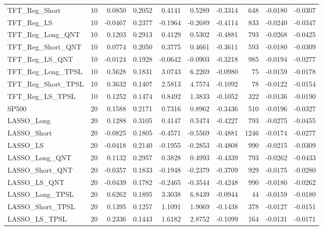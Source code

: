 \begin{tabular}{llrrrrrrrr}
\cline{1-10}
TFT\_Reg\_Short & 10 & 0.0850 & 0.2052 & 0.4141 & 0.5289 & -0.3314 & 648 & -0.0180 & -0.0307 \\
\cline{1-10}
TFT\_Reg\_LS & 10 & -0.0467 & 0.2377 & -0.1964 & -0.2689 & -0.4114 & 833 & -0.0240 & -0.0347 \\
\cline{1-10}
TFT\_Reg\_Long\_QNT & 10 & 0.1203 & 0.2913 & 0.4129 & 0.5302 & -0.4881 & 793 & -0.0268 & -0.0425 \\
\cline{1-10}
TFT\_Reg\_Short\_QNT & 10 & 0.0774 & 0.2050 & 0.3775 & 0.4661 & -0.3611 & 593 & -0.0180 & -0.0309 \\
\cline{1-10}
TFT\_Reg\_LS\_QNT & 10 & -0.0124 & 0.1928 & -0.0642 & -0.0903 & -0.3218 & 985 & -0.0194 & -0.0277 \\
\cline{1-10}
TFT\_Reg\_Long\_TPSL & 10 & 0.5628 & 0.1831 & 3.0743 & 6.2269 & -0.0980 & 75 & -0.0159 & -0.0178 \\
\cline{1-10}
TFT\_Reg\_Short\_TPSL & 10 & 0.3632 & 0.1407 & 2.5813 & 4.7574 & -0.1092 & 78 & -0.0122 & -0.0154 \\
\cline{1-10}
TFT\_Reg\_LS\_TPSL & 10 & 0.1252 & 0.1474 & 0.8492 & 1.3833 & -0.1052 & 322 & -0.0136 & -0.0190 \\
\cline{1-10}
SP500 & 20 & 0.1588 & 0.2171 & 0.7316 & 0.8962 & -0.3436 & 510 & -0.0196 & -0.0327 \\
\cline{1-10}
LASSO\_Long & 20 & 0.1288 & 0.3105 & 0.4147 & 0.5474 & -0.4227 & 793 & -0.0275 & -0.0455 \\
\cline{1-10}
LASSO\_Short & 20 & -0.0825 & 0.1805 & -0.4571 & -0.5569 & -0.4881 & 1246 & -0.0174 & -0.0277 \\
\cline{1-10}
LASSO\_LS & 20 & -0.0418 & 0.2140 & -0.1955 & -0.2853 & -0.4808 & 990 & -0.0215 & -0.0309 \\
\cline{1-10}
LASSO\_Long\_QNT & 20 & 0.1132 & 0.2957 & 0.3828 & 0.4993 & -0.4339 & 793 & -0.0262 & -0.0433 \\
\cline{1-10}
LASSO\_Short\_QNT & 20 & -0.0357 & 0.1833 & -0.1948 & -0.2379 & -0.3709 & 929 & -0.0175 & -0.0280 \\
\cline{1-10}
LASSO\_LS\_QNT & 20 & -0.0439 & 0.1782 & -0.2465 & -0.3544 & -0.4248 & 990 & -0.0180 & -0.0262 \\
\cline{1-10}
LASSO\_Long\_TPSL & 20 & 0.6262 & 0.1895 & 3.3038 & 6.8439 & -0.0944 & 44 & -0.0159 & -0.0180 \\
\cline{1-10}
LASSO\_Short\_TPSL & 20 & 0.1395 & 0.1257 & 1.1091 & 1.9069 & -0.1438 & 378 & -0.0127 & -0.0151 \\
\cline{1-10}
LASSO\_LS\_TPSL & 20 & 0.2336 & 0.1443 & 1.6182 & 2.8752 & -0.1099 & 164 & -0.0131 & -0.0171 \\

\end{tabular}
